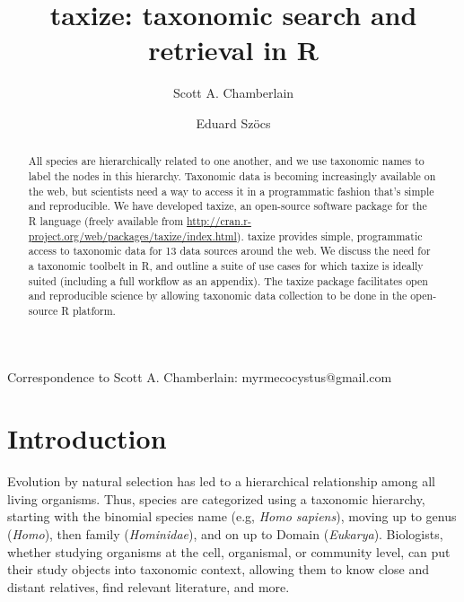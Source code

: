 \documentclass[10pt,a4paper,twocolumn]{article}\usepackage[]{graphicx}\usepackage[]{color}
\begin{document}
\title{taxize: taxonomic search and retrieval in R}
\author[1]{Scott A. Chamberlain}
\author[2]{Eduard Sz\"{o}cs}

\maketitle
\thispagestyle{fancy}

Correspondence to Scott A. Chamberlain: myrmecocystus@gmail.com

\begin{abstract}
All species are hierarchically related to one another, and we use taxonomic names to label the nodes in this hierarchy. Taxonomic data is becoming increasingly available on the web, but scientists need a way to access it in a programmatic fashion that's simple and reproducible. We have developed taxize, an open-source software package for the R language (freely available from \url{http://cran.r-project.org/web/packages/taxize/index.html}). taxize provides simple, programmatic access to taxonomic data for 13 data sources around the web. We discuss the need for a taxonomic toolbelt in R, and outline a suite of use cases for which taxize is ideally suited (including a full workflow as an appendix). The taxize package facilitates open and reproducible science by allowing taxonomic data collection to be done in the open-source R platform.
\end{abstract}
\clearpage

\section*{Introduction}
Evolution by natural selection has led to a hierarchical relationship among all living organisms.  Thus, species are categorized using a taxonomic hierarchy, starting with the binomial species name (e.g, \emph{Homo sapiens}), moving up to genus (\emph{Homo}), then family (\emph{Hominidae}), and on up to Domain (\emph{Eukarya}). Biologists, whether studying organisms at the cell, organismal, or community level, can put their study objects into taxonomic context, allowing them to know close and distant relatives, find relevant literature, and more. 
\end{document}
